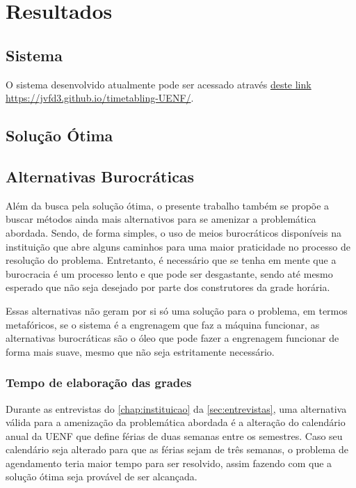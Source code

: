 \chapter{Resultados} \label{chap:resultados} %



\section{Sistema} %

O sistema desenvolvido atualmente pode ser acessado através \href{https://jvfd3.github.io/timetabling-UENF/}{deste link} \url{https://jvfd3.github.io/timetabling-UENF/}.

\section{Solução Ótima} %

\section{Alternativas Burocráticas} %

Além da busca pela solução ótima, o presente trabalho também se propõe a buscar métodos ainda mais alternativos para se amenizar a problemática abordada. Sendo, de forma simples, o uso de meios burocráticos disponíveis na instituição que abre alguns caminhos para uma maior praticidade no processo de resolução do problema. Entretanto, é necessário que se tenha em mente que a burocracia é um processo lento e que pode ser desgastante, sendo até mesmo esperado que não seja desejado por parte dos construtores da grade horária.

Essas alternativas não geram por si só uma solução para o problema, em termos metafóricos, se o sistema é a engrenagem que faz a máquina funcionar, as alternativas burocráticas são o óleo que pode fazer a engrenagem funcionar de forma mais suave, mesmo que não seja estritamente necessário.

\subsection{Tempo de elaboração das grades} %

Durante as entrevistas do \autoref{chap:instituicao} da \autoref{sec:entrevistas}, uma alternativa válida para a amenização da problemática abordada é a alteração do calendário anual da UENF que define férias de duas semanas entre os semestres. Caso seu calendário seja alterado para que as férias sejam de três semanas, o problema de agendamento teria maior tempo para ser resolvido, assim fazendo com que a solução ótima seja provável de ser alcançada.

